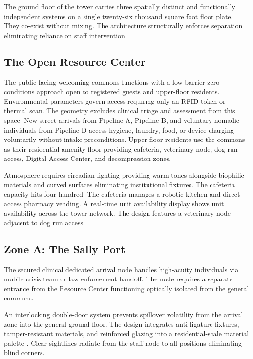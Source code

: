 \documentclass[12pt, letterpaper]{article}
\begin{document}
The ground floor of the tower carries three spatially distinct and functionally independent systems on a single twenty-six thousand square foot floor plate. They co-exist without mixing. The architecture structurally enforces separation eliminating reliance on staff intervention.

\subsection{The Open Resource Center}

The public-facing welcoming commons functions with a low-barrier zero-conditions approach open to registered guests and upper-floor residents. Environmental parameters govern access requiring only an RFID token or thermal scan. The geometry excludes clinical triage and assessment from this space. New street arrivals from Pipeline A, Pipeline B, and voluntary nomadic individuals from Pipeline D access hygiene, laundry, food, or device charging voluntarily without intake preconditions. Upper-floor residents use the commons as their residential amenity floor providing cafeteria, veterinary node, dog run access, Digital Access Center, and decompression zones.

Atmosphere requires circadian lighting providing warm tones alongside biophilic materials and curved surfaces eliminating institutional fixtures. The cafeteria capacity hits four hundred. The cafeteria manages a robotic kitchen and direct-access pharmacy vending. A real-time unit availability display shows unit availability across the tower network. The design features a veterinary node adjacent to dog run access.

\subsection{Zone A: The Sally Port}

The secured clinical dedicated arrival node handles high-acuity individuals via mobile crisis team or law enforcement handoff. The node requires a separate entrance from the Resource Center functioning optically isolated from the general commons.

An interlocking double-door system prevents spillover volatility from the arrival zone into the general ground floor. The design integrates anti-ligature fixtures, tamper-resistant materials, and reinforced glazing into a residential-scale material palette \citep{empath_model_2020}. Clear sightlines radiate from the staff node to all positions eliminating blind corners.
\end{document}
